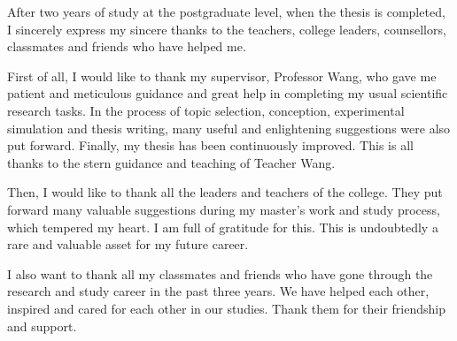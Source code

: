 
\begin{acknowledgments}





    After two years of study at the postgraduate level, when the thesis is completed, I sincerely express my sincere thanks to the teachers, college leaders, counsellors, classmates and friends who have helped me.

    First of all, I would like to thank my supervisor, Professor Wang, who gave me patient and meticulous guidance and great help in completing my usual scientific research tasks. In the process of topic selection, conception, experimental simulation and thesis writing, many useful and enlightening suggestions were also put forward. Finally, my thesis has been continuously improved. This is all thanks to the stern guidance and teaching of Teacher Wang.

    Then, I would like to thank all the leaders and teachers of the college. They put forward many valuable suggestions during my master's work and study process, which tempered my heart. I am full of gratitude for this. This is undoubtedly a rare and valuable asset for my future career.

    I also want to thank all my classmates and friends who have gone through the research and study career in the past three years. We have helped each other, inspired and cared for each other in our studies. Thank them for their friendship and support.

\end{acknowledgments}
